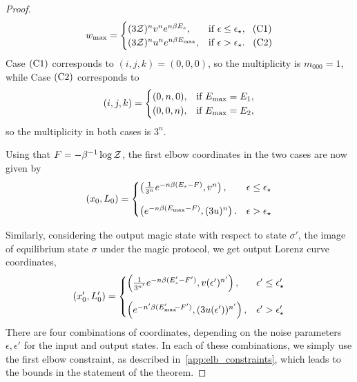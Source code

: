 \begin{proof}
\begin{equation*}
w_{\rm max} =
	\begin{cases}
		(3\mathcal{Z})^{n} v^n e^{n\beta E_s}, &\mbox{if }\epsilon \leq \epsilon_{\star},\ \hspace{3pt}\rm{(C1)}\\
		(3\mathcal{Z})^{n} u^n e^{n\beta E_{\rm{max}}}, &\mbox{if }\epsilon > \epsilon_{\star}.\ \hspace{5pt}\rm{(C2)} 
	\end{cases}
\end{equation*}
Case $\rm{(C1)}$ corresponds to $(i,j,k) = (0,0,0)$, so the multiplicity is $m_{000} = 1$, while
Case $\rm{(C2)}$ corresponds to
\begin{equation}
	(i,j,k) = 
	\begin{cases}
	(0,n,0), &\text{if } E_{\rm{max}} = E_1, \\
	(0,0,n), &\text{if } E_{\rm{max}} = E_2,
	\end{cases}
\end{equation}
so the multiplicity in both cases is $3^n$.

Using that $F = -\beta^{-1} \log \mathcal{Z}$, the first elbow coordinates in the two cases are now given by
\begin{equation}\label{eq:first_elb_coords}
	(x_0, L_0) =
	\begin{cases}
		\left(\frac{1}{3^n} e^{-n\beta (E_s - F)}, v^n \right), &\epsilon \leq \epsilon_\star \vspace{10pt}\\
		\left( e^{-n\beta (E_{\rm{max}}-F)}, (3u)^n \right). &\epsilon > \epsilon_\star
	\end{cases}
\end{equation}

Similarly, considering the output magic state with respect to state $\sigma'$, the image of equilibrium state $\sigma$ under the magic protocol, we get output Lorenz curve coordinates,
\begin{equation}\label{eq:transformed_first_elb_coords}
	(x'_0, L'_0) =
	\begin{cases}
		\left(\frac{1}{3^{n'}} e^{-n\beta (E'_s - F')}, v(\epsilon')^{n'} \right), &\epsilon' \leq \epsilon'_\star \vspace{10pt}\\
		\left( e^{-n'\beta (E'_{\rm{max}}\hspace{-2.5pt}-F')}, (3u(\epsilon'))^{n'} \right), &\epsilon' > \epsilon'_\star
	\end{cases}
\end{equation}
There are four combinations of coordinates, depending on the noise parameters $\epsilon, \epsilon'$ for the input and output states.
In each of these combinations, we simply use the first elbow constraint, as described in~\cref{app:elb_constraints}, which leads to the bounds in the statement of the theorem.
\end{proof}


